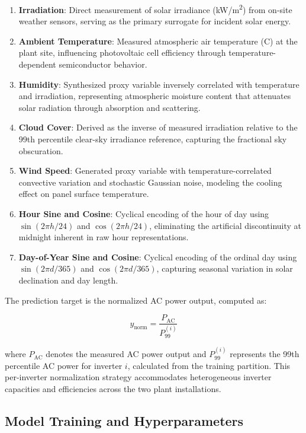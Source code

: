 \documentclass[conference]{IEEEtran}
\begin{document}
\begin{enumerate}
\item \textbf{Irradiation}: Direct measurement of solar irradiance (kW/m\textsuperscript{2}) from on-site weather sensors, serving as the primary surrogate for incident solar energy.
\item \textbf{Ambient Temperature}: Measured atmospheric air temperature (\textdegree C) at the plant site, influencing photovoltaic cell efficiency through temperature-dependent semiconductor behavior.
\item \textbf{Humidity}: Synthesized proxy variable inversely correlated with temperature and irradiation, representing atmospheric moisture content that attenuates solar radiation through absorption and scattering.
\item \textbf{Cloud Cover}: Derived as the inverse of measured irradiation relative to the 99th percentile clear-sky irradiance reference, capturing the fractional sky obscuration.
\item \textbf{Wind Speed}: Generated proxy variable with temperature-correlated convective variation and stochastic Gaussian noise, modeling the cooling effect on panel surface temperature.
\item \textbf{Hour Sine and Cosine}: Cyclical encoding of the hour of day using $\sin(2\pi h/24)$ and $\cos(2\pi h/24)$, eliminating the artificial discontinuity at midnight inherent in raw hour representations.
\item \textbf{Day-of-Year Sine and Cosine}: Cyclical encoding of the ordinal day using $\sin(2\pi d/365)$ and $\cos(2\pi d/365)$, capturing seasonal variation in solar declination and day length.
\end{enumerate}

The prediction target is the normalized AC power output, computed as:

\begin{equation}
y_{\text{norm}} = \frac{P_{\text{AC}}}{P_{99}^{(i)}}
\label{eq:norm}
\end{equation}

where $P_{\text{AC}}$ denotes the measured AC power output and $P_{99}^{(i)}$ represents the 99th percentile AC power for inverter $i$, calculated from the training partition. This per-inverter normalization strategy accommodates heterogeneous inverter capacities and efficiencies across the two plant installations.

\subsection{Model Training and Hyperparameters}
\end{document}
